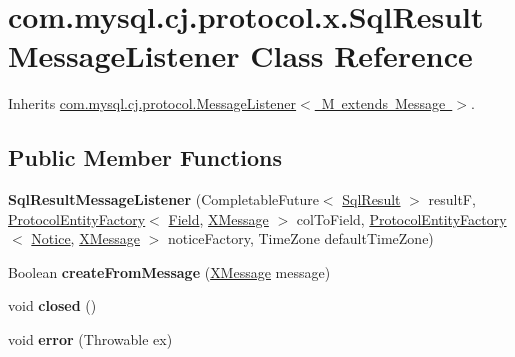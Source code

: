 \hypertarget{classcom_1_1mysql_1_1cj_1_1protocol_1_1x_1_1_sql_result_message_listener}{}\section{com.\+mysql.\+cj.\+protocol.\+x.\+Sql\+Result\+Message\+Listener Class Reference}
\label{classcom_1_1mysql_1_1cj_1_1protocol_1_1x_1_1_sql_result_message_listener}


Inherits \mbox{\hyperlink{interfacecom_1_1mysql_1_1cj_1_1protocol_1_1_message_listener}{com.\+mysql.\+cj.\+protocol.\+Message\+Listener$<$ M extends Message $>$}}.

\subsection*{Public Member Functions}
\begin{DoxyCompactItemize}
\item 
\mbox{\label{classcom_1_1mysql_1_1cj_1_1protocol_1_1x_1_1_sql_result_message_listener_a7edde22bb73f2b236c3f36064b394ab7}} 
{\bfseries Sql\+Result\+Message\+Listener} (Completable\+Future$<$ \mbox{\hyperlink{interfacecom_1_1mysql_1_1cj_1_1xdevapi_1_1_sql_result}{Sql\+Result}} $>$ resultF, \mbox{\hyperlink{interfacecom_1_1mysql_1_1cj_1_1protocol_1_1_protocol_entity_factory}{Protocol\+Entity\+Factory}}$<$ \mbox{\hyperlink{classcom_1_1mysql_1_1cj_1_1result_1_1_field}{Field}}, \mbox{\hyperlink{classcom_1_1mysql_1_1cj_1_1protocol_1_1x_1_1_x_message}{X\+Message}} $>$ col\+To\+Field, \mbox{\hyperlink{interfacecom_1_1mysql_1_1cj_1_1protocol_1_1_protocol_entity_factory}{Protocol\+Entity\+Factory}}$<$ \mbox{\hyperlink{classcom_1_1mysql_1_1cj_1_1protocol_1_1x_1_1_notice}{Notice}}, \mbox{\hyperlink{classcom_1_1mysql_1_1cj_1_1protocol_1_1x_1_1_x_message}{X\+Message}} $>$ notice\+Factory, Time\+Zone default\+Time\+Zone)
\item 
\mbox{\label{classcom_1_1mysql_1_1cj_1_1protocol_1_1x_1_1_sql_result_message_listener_a9ae337c27d98176211d9889cc1ae940b}} 
Boolean {\bfseries create\+From\+Message} (\mbox{\hyperlink{classcom_1_1mysql_1_1cj_1_1protocol_1_1x_1_1_x_message}{X\+Message}} message)
\item 
\mbox{\label{classcom_1_1mysql_1_1cj_1_1protocol_1_1x_1_1_sql_result_message_listener_a6d9d429bc58631ea5146aca4e841090f}} 
void {\bfseries closed} ()
\item 
\mbox{\label{classcom_1_1mysql_1_1cj_1_1protocol_1_1x_1_1_sql_result_message_listener_a3ca9df6d049404bea5161c1ac4e3be29}} 
void {\bfseries error} (Throwable ex)
\end{DoxyCompactItemize}


